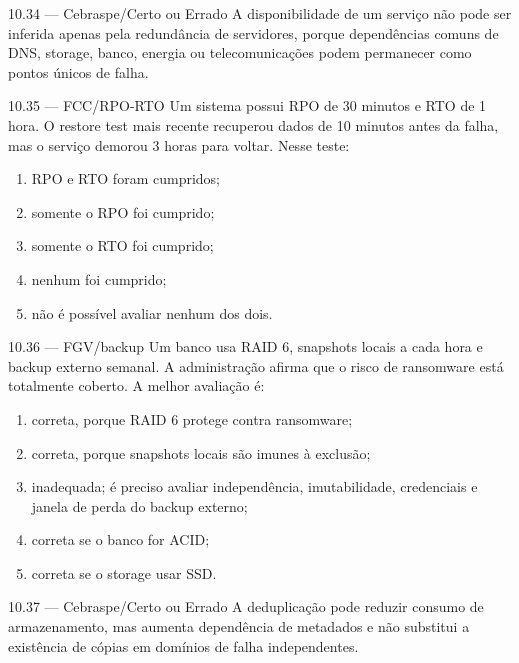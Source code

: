 \begin{questao}{ 10.34 — Cebraspe/Certo ou Errado}
A disponibilidade de um serviço não pode ser inferida apenas pela redundância de servidores, porque dependências comuns de DNS, storage, banco, energia ou telecomunicações podem permanecer como pontos únicos de falha.
\end{questao}

\begin{questao}{ 10.35 — FCC/RPO-RTO}
Um sistema possui RPO de 30 minutos e RTO de 1 hora. O restore test mais recente recuperou dados de 10 minutos antes da falha, mas o serviço demorou 3 horas para voltar. Nesse teste:
\begin{enumerate}[label=\Alph*)]
\item RPO e RTO foram cumpridos;
\item somente o RPO foi cumprido;
\item somente o RTO foi cumprido;
\item nenhum foi cumprido;
\item não é possível avaliar nenhum dos dois.
\end{enumerate}
\end{questao}

\begin{questao}{ 10.36 — FGV/backup}
Um banco usa RAID 6, snapshots locais a cada hora e backup externo semanal. A administração afirma que o risco de ransomware está totalmente coberto. A melhor avaliação é:
\begin{enumerate}[label=\Alph*)]
\item correta, porque RAID 6 protege contra ransomware;
\item correta, porque snapshots locais são imunes à exclusão;
\item inadequada; é preciso avaliar independência, imutabilidade, credenciais e janela de perda do backup externo;
\item correta se o banco for ACID;
\item correta se o storage usar SSD.
\end{enumerate}
\end{questao}

\begin{questao}{ 10.37 — Cebraspe/Certo ou Errado}
A deduplicação pode reduzir consumo de armazenamento, mas aumenta dependência de metadados e não substitui a existência de cópias em domínios de falha independentes.
\end{questao}

